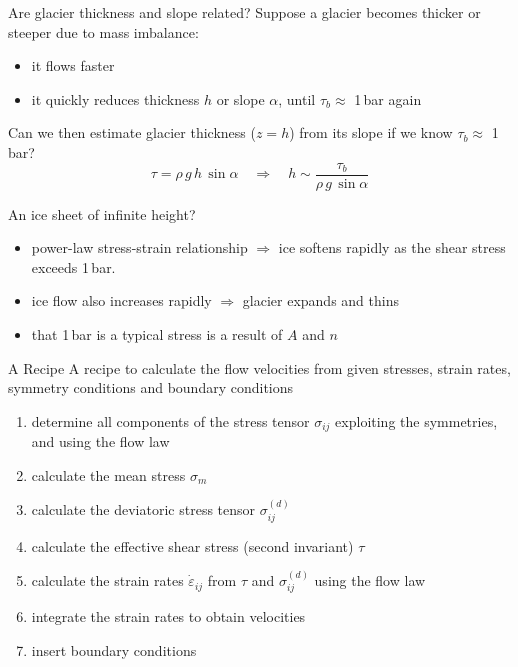 \documentclass[hide notes,intlimits,unknownkeysallowed]{beamer}
\newcommand{\epsdot}{\dot{\varepsilon}}
\begin{document}
\begin{frame}{Are glacier thickness and slope related?}
  Suppose a glacier becomes thicker or steeper due to mass imbalance:
  \begin{itemize}
    \item it flows faster
    \item it quickly reduces thickness $h$ or slope $\alpha$, until $\tau_{b} \approx$ 1\,bar again
  \end{itemize}
  Can we then estimate glacier thickness ($z=h$) from its slope if we know $\tau_{b} \approx$ 1\,bar?
  \begin{displaymath}
    \tau = \rho\,g\,h\,\sin{\alpha} \quad \Rightarrow \quad h \sim \frac{\tau_{b}}{\rho\,g\,\sin{\alpha}}
  \end{displaymath}
\end{frame}


\begin{frame}{An ice sheet of infinite height?}
\begin{itemize}
  \item power-law stress-strain relationship $\Rightarrow$ ice softens
    rapidly as the shear stress exceeds 1\,bar.
  \item ice flow also increases rapidly $\Rightarrow$ glacier expands
    and thins
  \item that 1\,bar is a typical stress is a result of $A$ and $n$
\end{itemize}

\end{frame}


\begin{frame}{A Recipe}
  A recipe to calculate the flow velocities from given stresses, strain rates, symmetry conditions and
  boundary conditions
  \begin{enumerate}
  \item determine all components of the stress tensor $\sigma_{ij}$
    exploiting the symmetries, and using the flow law
  \item calculate the mean stress $\sigma_m$
  \item calculate the deviatoric stress tensor $\sigma^{(d)}_{ij}$
  \item calculate the effective shear stress (second invariant) $\tau$
  \item calculate the strain rates $\epsdot_{ij}$ from $\tau$ and
    $\sigma^{(d)}_{ij}$ using  the flow law
  \item integrate the strain rates to obtain velocities
  \item insert boundary conditions
  \end{enumerate}
\end{frame}
\end{document}
